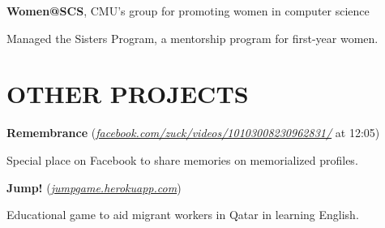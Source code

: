 \documentclass[margin, 11pt]{res} %
\begin{document}
\begin{resume}
\vspace{3pt}

{\bf Women@SCS}, CMU's group for promoting women in computer science

\begin{itemize} \itemsep -2pt
{\small \item Managed the Sisters Program, a mentorship program for first-year women.}
\end{itemize}



\section{OTHER PROJECTS}

{\bf Remembrance} {\small (\href{https://www.facebook.com/zuck/videos/10103008230962831/}{\sl facebook.com/zuck/videos/10103008230962831/} at 12:05)}

\begin{itemize} \itemsep -2pt
{\small \item Special place on Facebook to share memories on memorialized profiles.}
\end{itemize}

\vspace{3pt}

{\bf Jump!} {\small (\href{http://jumpgame.herokuapp.com/}{\sl jumpgame.herokuapp.com}) }

\begin{itemize} \itemsep -2pt
{\small \item Educational game to aid migrant workers in Qatar in learning English.}
\end{itemize}




\end{resume}
\end{document}
